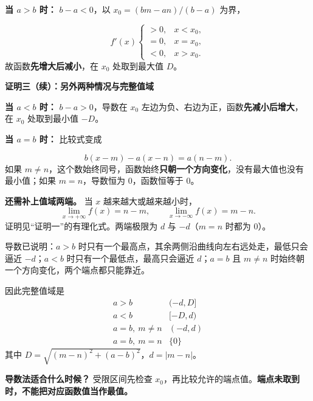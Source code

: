 \clearpage
\begin{proofbox}
\textbf{当 $a>b$ 时：} $b-a<0$，以 $x_0=(bm-an)/(b-a)$ 为界，


\[
 f'(x)\begin{cases}>0,&x<x_0,\\=0,&x=x_0,\\<0,&x>x_0.\end{cases}
\]
故函数\textbf{先增大后减小}，在 $x_0$ 处取到最大值 $D$。
\end{proofbox}
\clearpage
\begin{proofbox}
\textbf{\textcolor{CProof}{证明三（续）：另外两种情况与完整值域}}



\textbf{当 $a<b$ 时：} $b-a>0$，导数在 $x_0$ 左边为负、右边为正，函数\textbf{先减小后增大}，在 $x_0$ 处取到最小值 $-D$。

\end{proofbox}
\clearpage
\begin{proofbox}
\textbf{当 $a=b$ 时：} 比较式变成


\[
 b(x-m)-a(x-n)=a(n-m).
\]
如果 $m\ne n$，这个数始终同号，函数始终\textbf{只朝一个方向变化}，没有最大值也没有最小值；如果 $m=n$，导数恒为 $0$，函数恒等于 $0$。

\textbf{还需补上值域两端。} 当 $x$ 越来越大或越来越小时，
\[
 \lim_{x\to+\infty}f(x)=n-m,\qquad
 \lim_{x\to-\infty}f(x)=m-n.
\]
证明见“证明一”的有理化式。两端极限为 $d$ 与 $-d$（$m=n$ 时都为 $0$）。

导数已说明：$a>b$ 时只有一个最高点，其余两侧沿曲线向左右远处走，最低只会逼近 $-d$；$a<b$ 时只有一个最低点，最高只会逼近 $d$；$a=b$ 且 $m\ne n$ 时始终朝一个方向变化，两个端点都只能靠近。

因此完整值域是
\[
 \boxed{\begin{array}{c|c}
 a>b&(-d,D]\\
 a<b&[-D,d)\\
 a=b,\ m\ne n&(-d,d)\\
 a=b,\ m=n&\{0\}
 \end{array}}
\]
其中 $D=\sqrt{(m-n)^2+(a-b)^2}$，$d=|m-n|$。

\textbf{导数法适合什么时候？} 受限区间先检查 $x_0$，再比较允许的端点值。\textbf{端点未取到时，不能把对应函数值当作最值。}
\end{proofbox}

